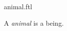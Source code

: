 \documentclass{stex}
\begin{document}
\begin{smodule}{animal.ftl}


\begin{signature}[forthel]
  A \emph{animal} is a being.
\end{signature}

\end{smodule}
\end{document}
